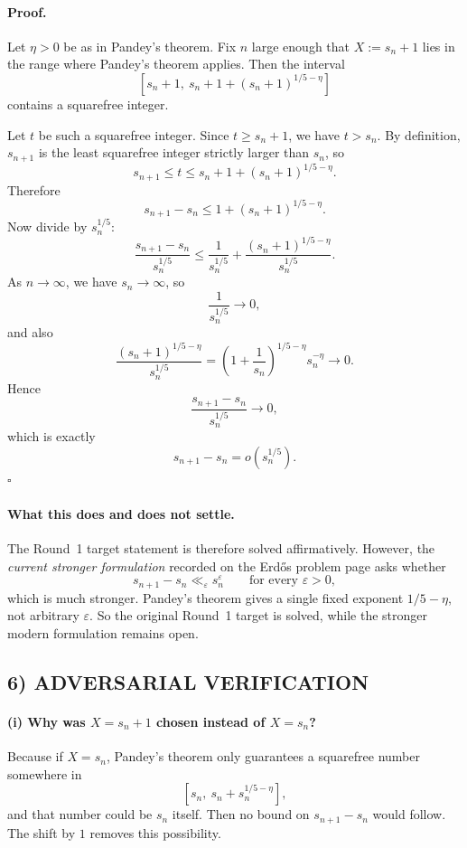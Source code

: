 \paragraph{Proof.}
Let $\eta>0$ be as in Pandey's theorem. Fix $n$ large enough that $X:=s_n+1$ lies in the range where Pandey's theorem applies. Then the interval
\[
[s_n+1,\ s_n+1+(s_n+1)^{1/5-\eta}]
\]
contains a squarefree integer.

Let $t$ be such a squarefree integer. Since $t\ge s_n+1$, we have $t>s_n$. By definition, $s_{n+1}$ is the least squarefree integer strictly larger than $s_n$, so
\[
s_{n+1}\le t\le s_n+1+(s_n+1)^{1/5-\eta}.
\]
Therefore
\[
s_{n+1}-s_n\le 1+(s_n+1)^{1/5-\eta}.
\]
Now divide by $s_n^{1/5}$:
\[
\frac{s_{n+1}-s_n}{s_n^{1/5}}
\le
\frac{1}{s_n^{1/5}}
+
\frac{(s_n+1)^{1/5-\eta}}{s_n^{1/5}}.
\]
As $n\to\infty$, we have $s_n\to\infty$, so
\[
\frac{1}{s_n^{1/5}}\to 0,
\]
and also
\[
\frac{(s_n+1)^{1/5-\eta}}{s_n^{1/5}}
=
\left(1+\frac{1}{s_n}\right)^{1/5-\eta}s_n^{-\eta}\to 0.
\]
Hence
\[
\frac{s_{n+1}-s_n}{s_n^{1/5}}\to 0,
\]
which is exactly
\[
s_{n+1}-s_n=o(s_n^{1/5}).
\]
\hfill $\square$

\paragraph{What this does and does not settle.}
The Round~1 target statement is therefore solved affirmatively. However, the \emph{current stronger formulation} recorded on the Erd\H{o}s problem page asks whether
\[
s_{n+1}-s_n\ll_\varepsilon s_n^\varepsilon
\qquad\text{for every }\varepsilon>0,
\]
which is much stronger. Pandey's theorem gives a single fixed exponent $1/5-\eta$, not arbitrary $\varepsilon$. So the original Round~1 target is solved, while the stronger modern formulation remains open.

\subsection*{6) ADVERSARIAL VERIFICATION}

\paragraph{(i) Why was $X=s_n+1$ chosen instead of $X=s_n$?}
Because if $X=s_n$, Pandey's theorem only guarantees a squarefree number somewhere in
\[
[s_n,\ s_n+s_n^{1/5-\eta}],
\]
and that number could be $s_n$ itself. Then no bound on $s_{n+1}-s_n$ would follow. The shift by $1$ removes this possibility.

